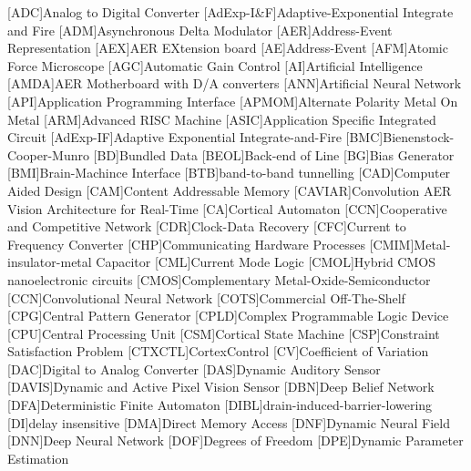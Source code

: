 [ADC]{Analog to Digital Converter}
[AdExp-I\&F]{Adaptive-Exponential Integrate and Fire}
[ADM]{Asynchronous Delta Modulator}
[AER]{Address-Event Representation}
[AEX]{AER EXtension board}
[AE]{Address-Event}
[AFM]{Atomic Force Microscope}
[AGC]{Automatic Gain Control}
[AI]{Artificial Intelligence}
[AMDA]{AER Motherboard with D/A converters}
[ANN]{Artificial Neural Network}
[API]{Application Programming Interface}
[APMOM]{Alternate Polarity Metal On Metal}
[ARM]{Advanced RISC Machine}
[ASIC]{Application Specific Integrated Circuit}
[AdExp-IF]{Adaptive Exponential Integrate-and-Fire}
[BMC]{Bienenstock-Cooper-Munro}
[BD]{Bundled Data}
[BEOL]{Back-end of Line}
[BG]{Bias Generator}
[BMI]{Brain-Machince Interface}
[BTB]{band-to-band tunnelling}
[CAD]{Computer Aided Design}
[CAM]{Content Addressable Memory}
[CAVIAR]{Convolution AER Vision Architecture for Real-Time}
[CA]{Cortical Automaton}
[CCN]{Cooperative and Competitive Network}
[CDR]{Clock-Data Recovery}
[CFC]{Current to Frequency Converter}
[CHP]{Communicating Hardware Processes}
[CMIM]{Metal-insulator-metal Capacitor}
[CML]{Current Mode Logic}
[CMOL]{Hybrid CMOS nanoelectronic circuits}
[CMOS]{Complementary Metal-Oxide-Semiconductor}
[CCN]{Convolutional Neural Network}
[COTS]{Commercial Off-The-Shelf}
[CPG]{Central Pattern Generator}
[CPLD]{Complex Programmable Logic Device}
[CPU]{Central Processing Unit}
[CSM]{Cortical State Machine}
[CSP]{Constraint Satisfaction Problem}
[CTXCTL]{CortexControl}
[CV]{Coefficient of Variation}
[DAC]{Digital to Analog Converter}
[DAS]{Dynamic Auditory Sensor}
[DAVIS]{Dynamic and Active Pixel Vision Sensor}
[DBN]{Deep Belief Network}
[DFA]{Deterministic Finite Automaton}
[DIBL]{drain-induced-barrier-lowering}
[DI]{delay insensitive}
[DMA]{Direct Memory Access}
[DNF]{Dynamic Neural Field}
[DNN]{Deep Neural Network}
[DOF]{Degrees of Freedom}
[DPE]{Dynamic Parameter Estimation}
